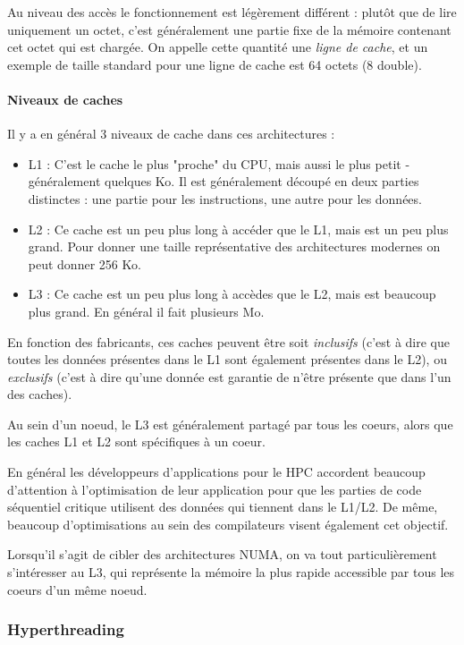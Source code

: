 Au niveau des accès le fonctionnement est légèrement différent : plutôt que de lire uniquement un octet, c'est généralement une partie fixe de la mémoire contenant cet octet qui est chargée.
On appelle cette quantité une \emph{ligne de cache}, et un exemple de taille standard pour une ligne de cache est 64 octets (8 double).

\paragraph{Niveaux de caches}

Il y a en général 3 niveaux de cache dans ces architectures :
\begin{itemize}
  \item L1 : C'est le cache le plus "proche" du CPU, mais aussi le plus petit - généralement quelques Ko. Il est généralement découpé en deux parties distinctes : une partie pour les instructions, une autre pour les données.
  \item L2 : Ce cache est un peu plus long à accéder que le L1, mais est un peu plus grand. Pour donner une taille représentative des architectures modernes on peut donner 256 Ko.
  \item L3 : Ce cache est un peu plus long à accèdes que le L2, mais est beaucoup plus grand. En général il fait plusieurs Mo.
\end{itemize}

En fonction des fabricants, ces caches peuvent être soit \emph{inclusifs} (c'est à dire que toutes les données présentes dans le L1 sont également présentes dans le L2), ou \emph{exclusifs} (c'est à dire qu'une donnée est garantie de n'être présente que dans l'un des caches).

Au sein d'un noeud, le L3 est généralement partagé par tous les coeurs, alors que les caches L1 et L2 sont spécifiques à un coeur.

En général les développeurs d'applications pour le HPC accordent beaucoup d'attention à l'optimisation de leur application pour que les parties de code séquentiel critique utilisent des données qui tiennent dans le L1/L2.
De même, beaucoup d'optimisations au sein des compilateurs visent également cet objectif.

Lorsqu'il s'agit de cibler des architectures NUMA, on va tout particulièrement s'intéresser au L3, qui représente la mémoire la plus rapide accessible par tous les coeurs d'un même noeud.

\subsubsection{Hyperthreading}

